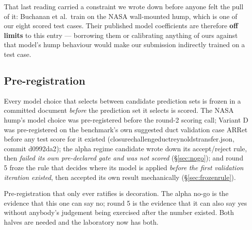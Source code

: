 \documentclass[11pt,a4paper]{article}
\newcommand{\breakus}{\textunderscore\allowbreak}
\newcommand{\code}[1]{{\small\ttfamily\let\_\breakus #1}}
\newcommand{\artifact}[1]{{\footnotesize\ttfamily\let\_\breakus #1}}
\begin{document}
That last reading carried a constraint we wrote down before anyone felt the pull of it:
Buchanan et al.\ train on the NASA wall-mounted hump, which is one of our eight scored test
cases. Their published model coefficients are therefore \textbf{off limits} to this entry
--- borrowing them or calibrating anything of ours against that model's hump behaviour
would make our submission indirectly trained on a test case.

\subsection{Pre-registration}

Every model choice that selects between candidate prediction sets is frozen in a committed
document \emph{before} the prediction set it selects is scored. The NASA hump's model
choice was pre-registered before the round-2 scoring call; Variant D was pre-registered on
the benchmark's own suggested duct validation case \code{AR\_7\_Ret\_180} before any test
score for it existed
(\artifact{closure\_challenge\_duct\_reynolds\_transfer.json}, commit
\code{d0992da2}); the \code{alpha\_05} regime candidate wrote down its accept/reject rule,
then \emph{failed its own pre-declared gate and was not scored} (\S\ref{sec:nogo}); and
round 5 froze the rule that decides where its model is applied \emph{before the first
validation iteration existed}, then accepted its own result mechanically
(\S\ref{sec:frozenrule}).

Pre-registration that only ever ratifies is decoration. The \code{alpha\_05} no-go is the
evidence that this one can say no; round 5 is the evidence that it can also say yes
without anybody's judgement being exercised after the number existed. Both halves are
needed and the laboratory now has both.
\end{document}
